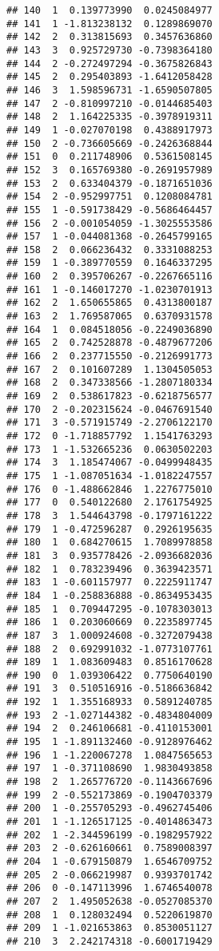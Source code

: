 \documentclass[
]{article}
\begin{document}
\begin{verbatim}
## 140  1  0.139773990  0.0245084977
## 141  1 -1.813238132  0.1289869070
## 142  2  0.313815693  0.3457636860
## 143  3  0.925729730 -0.7398364180
## 144  2 -0.272497294 -0.3675826843
## 145  2  0.295403893 -1.6412058428
## 146  3  1.598596731 -1.6590507805
## 147  2 -0.810997210 -0.0144685403
## 148  2  1.164225335 -0.3978919311
## 149  1 -0.027070198  0.4388917973
## 150  2 -0.736605669 -0.2426368844
## 151  0  0.211748906  0.5361508145
## 152  3  0.165769380 -0.2691957989
## 153  2  0.633404379 -0.1871651036
## 154  2 -0.952997751  0.1208084781
## 155  1 -0.591738429 -0.5686464457
## 156  2 -0.001054059 -1.3025553586
## 157  1 -0.044081368 -0.2645799165
## 158  2  0.066236432  0.3331088253
## 159  1 -0.389770559  0.1646337295
## 160  2  0.395706267 -0.2267665116
## 161  1 -0.146017270 -1.0230701913
## 162  2  1.650655865  0.4313800187
## 163  2  1.769587065  0.6370931578
## 164  1  0.084518056 -0.2249036890
## 165  2  0.742528878 -0.4879677206
## 166  2  0.237715550 -0.2126991773
## 167  2  0.101607289  1.1304505053
## 168  2  0.347338566 -1.2807180334
## 169  2  0.538617823 -0.6218756577
## 170  2 -0.202315624 -0.0467691540
## 171  3 -0.571915749 -2.2706122170
## 172  0 -1.718857792  1.1541763293
## 173  1 -1.532665236  0.0630502203
## 174  3  1.185474067 -0.0499948435
## 175  1 -1.087051634 -1.0182247557
## 176  0 -1.488662846  1.2276775010
## 177  0  0.540122680  2.1761754925
## 178  3  1.544643798 -0.1797161222
## 179  1 -0.472596287  0.2926195635
## 180  1  0.684270615  1.7089978858
## 181  3  0.935778426 -2.0936682036
## 182  1  0.783239496  0.3639423571
## 183  1 -0.601157977  0.2225911747
## 184  1 -0.258836888 -0.8634953435
## 185  1  0.709447295 -0.1078303013
## 186  1  0.203060669  0.2235897745
## 187  3  1.000924608 -0.3272079438
## 188  2  0.692991032 -1.0773107761
## 189  1  1.083609483  0.8516170628
## 190  0  1.039306422  0.7750640190
## 191  3  0.510516916 -0.5186636842
## 192  1  1.355168933  0.5891240785
## 193  2 -1.027144382 -0.4834804009
## 194  2  0.246106681 -0.4110153001
## 195  1 -1.891132460 -0.9128976462
## 196  1 -1.220067278  1.0847565653
## 197  1 -0.371108690  1.9830493858
## 198  2  1.265776720 -0.1143667696
## 199  2 -0.552173869 -0.1904703379
## 200  1 -0.255705293 -0.4962745406
## 201  1 -1.126517125 -0.4014863473
## 202  1 -2.344596199 -0.1982957922
## 203  2 -0.626160661  0.7589008397
## 204  1 -0.679150879  1.6546709752
## 205  2 -0.066219987  0.9393701742
## 206  0 -0.147113996  1.6746540078
## 207  2  1.495052638 -0.0527085370
## 208  1  0.128032494  0.5220619870
## 209  1 -1.021653863  0.8530051127
## 210  3  2.242174318 -0.6001719429

\end{verbatim}
\end{document}

